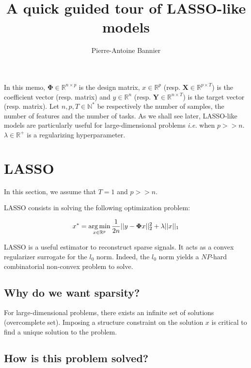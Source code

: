 \documentclass[a4paper,10pt]{article}
\author{Pierre-Antoine Bannier}
\title{A quick guided tour of LASSO-like models}
\theoremstyle{definition}
\begin{document}
\maketitle

\vskip 0.3in

In this memo, $\mathbf{\Phi} \in \mathbb{R}^{n \times p}$ is the design matrix, $x \in \mathbb{R}^{p}$ (resp. $\mathbf{X} \in \mathbb{R}^{p \times T}$) is the coefficient vector (resp. matrix) and $y \in \mathbb{R}^n$
(resp. $\mathbf{Y} \in \mathbb{R}^{n \times T}$) is the target vector (resp. matrix). Let $n, p, T \in \mathbb{N}^*$ be respectively the number of samples, the number of features and the number of tasks. As we shall see later, LASSO-like models
are particularly useful for large-dimensional problems \textit{i.e.} when $p >> n$. $\lambda \in \mathbb{R}^+$ is a regularizing hyperparameter.

\section{LASSO}
\label{section_1}

In this section, we assume that $T = 1$ and $p >> n$.

\vskip 0.2in

LASSO consists in solving the following optimization problem:

\begin{equation*}
    x^* = \operatorname*{arg\,min}_{x \in \mathbb{R}^{p}} \frac{1}{2n}\lvert\lvert y - \mathbf{\Phi} x \rvert\rvert_2^2 + \lambda \lvert\lvert x \rvert\rvert_{1}    
\end{equation*}

\vskip 0.1in

LASSO is a useful estimator to reconstruct sparse signals. It acts as a convex regularizer surrogate for the $l_0$ norm. Indeed, the 
$l_0$ norm yields a $NP$-hard combinatorial non-convex problem to solve. \\

\subsection*{Why do we want sparsity?}

For large-dimensional problems, there exists an infinite set of solutions (overcomplete set).
Imposing a structure constraint on the solution $x$ is critical to find a unique solution to the problem.

\subsection*{How is this problem solved?}
\end{document}
